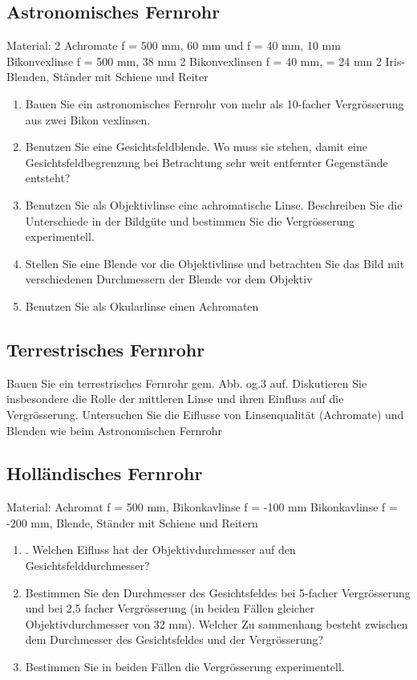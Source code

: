\subsection{Astronomisches Fernrohr}
Material: 2 Achromate f = 500 mm, 60 mm und f = 40 mm, 10 mm Bikonvexlinse f = 500 mm, 38
mm 2 Bikonvexlinsen f = 40 mm, = 24 mm 2 Iris-Blenden, Ständer mit Schiene und Reiter
\begin{enumerate}
 \item   Bauen Sie ein astronomisches Fernrohr von mehr als 10-facher Vergrösserung aus zwei Bikon
 vexlinsen.
 \item Benutzen Sie eine Gesichtsfeldblende. Wo muss sie stehen, damit eine Gesichtsfeldbegrenzung
 bei Betrachtung sehr weit entfernter Gegenstände entsteht?
 \item  Benutzen Sie als Objektivlinse eine achromatische Linse. Beschreiben Sie die Unterschiede in
 der Bildgüte und bestimmen Sie die Vergrösserung experimentell.
 \item Stellen Sie eine Blende vor die Objektivlinse und betrachten Sie das Bild mit verschiedenen
 Durchmessern der Blende vor dem Objektiv
 \item Benutzen Sie als Okularlinse einen Achromaten
\end{enumerate}
\subsection{Terrestrisches Fernrohr}
Bauen Sie ein terrestrisches Fernrohr gem. Abb. og.3 auf. Diskutieren Sie insbesondere die Rolle
der mittleren Linse und ihren Einfluss auf die Vergrösserung. Untersuchen Sie die Eiflusse von
Linsenqualität (Achromate) und Blenden wie beim Astronomischen Fernrohr
\subsection{Holländisches Fernrohr}
Material: Achromat f = 500 mm, Bikonkavlinse f = -100 mm Bikonkavlinse f = -200 mm, Blende,
Ständer mit Schiene und Reitern
\begin{enumerate}
 \item . Welchen Eifluss hat der Objektivdurchmesser auf den Gesichtsfelddurchmesser?
 \item Bestimmen Sie den Durchmesser des Gesichtsfeldes bei 5-facher Vergrösserung und bei 2,5
 facher Vergrösserung (in beiden Fällen gleicher Objektivdurchmesser von 32 mm). Welcher Zu
 sammenhang besteht zwischen dem Durchmesser des Gesichtsfeldes und der Vergrösserung?
 \item Bestimmen Sie in beiden Fällen die Vergrösserung experimentell.
 
\end{enumerate}
